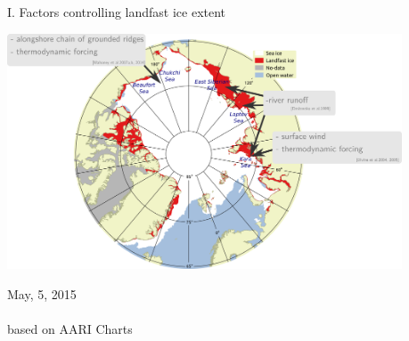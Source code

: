 \documentclass[8pt]{beamer}
\newcommand\Fontvi{\fontsize{6}{7.2}\selectfont}
\begin{document}
\setwatermark{\fontsize{125pt}{125pt}\selectfont{}}
\begin{frame}[fragile]{I. Factors controlling landfast ice extent}
	\begin{center}
		\includegraphics[height=7cm]{./img/FI_knowledge.png}\\
	\end{center}
	May, 5, 2015\\~\\
	\Fontvi
	based on AARI Charts
\end{frame}

%
\end{document}
